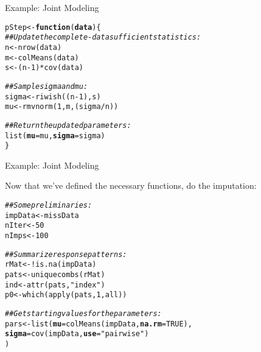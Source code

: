 \documentclass{beamer}\usepackage[]{graphicx}\usepackage[]{color}
\makeatletter
\newcommand{\hlnum}[1]{\textcolor[rgb]{0.69,0.494,0}{#1}}%
\newcommand{\hlstr}[1]{\textcolor[rgb]{0.749,0.012,0.012}{#1}}%
\newcommand{\hlcom}[1]{\textcolor[rgb]{0.514,0.506,0.514}{\textit{#1}}}%
\newcommand{\hlopt}[1]{\textcolor[rgb]{0,0,0}{#1}}%
\newcommand{\hlstd}[1]{\textcolor[rgb]{0,0,0}{#1}}%
\newcommand{\hlkwa}[1]{\textcolor[rgb]{0,0,0}{\textbf{#1}}}%
\newcommand{\hlkwb}[1]{\textcolor[rgb]{0,0.341,0.682}{#1}}%
\newcommand{\hlkwc}[1]{\textcolor[rgb]{0,0,0}{\textbf{#1}}}%
\newcommand{\hlkwd}[1]{\textcolor[rgb]{0.004,0.004,0.506}{#1}}%
\newenvironment{kframe}{%
 \def\at@end@of@kframe{}%
 \ifinner\ifhmode%
  \def\at@end@of@kframe{\end{minipage}}%
  \begin{minipage}{\columnwidth}%
 \fi\fi%
 \def\FrameCommand##1{\hskip\@totalleftmargin \hskip-\fboxsep
 \colorbox{shadecolor}{##1}\hskip-\fboxsep
     \hskip-\linewidth \hskip-\@totalleftmargin \hskip\columnwidth}%
 \MakeFramed {\advance\hsize-\width
   \@totalleftmargin\z@ \linewidth\hsize
   \@setminipage}}%
 {\par\unskip\endMakeFramed%
 \at@end@of@kframe}
\newenvironment{knitrout}{}{} %
\makeatother
\begin{document}
\begin{frame}[fragile]{Example: Joint Modeling}

\begin{knitrout}\footnotesize
{}\color{fgcolor}\begin{kframe}
\begin{alltt}
\hlstd{pStep} \hlkwb{<-} \hlkwa{function}\hlstd{(}\hlkwc{data}\hlstd{) \{}
    \hlcom{## Update the complete-data sufficient statistics:}
    \hlstd{n} \hlkwb{<-} \hlkwd{nrow}\hlstd{(data)}
    \hlstd{m} \hlkwb{<-} \hlkwd{colMeans}\hlstd{(data)}
    \hlstd{s} \hlkwb{<-} \hlstd{(n} \hlopt{-} \hlnum{1}\hlstd{)} \hlopt{*} \hlkwd{cov}\hlstd{(data)}

    \hlcom{## Sample sigma and mu:}
    \hlstd{sigma} \hlkwb{<-} \hlkwd{riwish}\hlstd{((n} \hlopt{-} \hlnum{1}\hlstd{), s)}
    \hlstd{mu}    \hlkwb{<-} \hlkwd{rmvnorm}\hlstd{(}\hlnum{1}\hlstd{, m, (sigma} \hlopt{/} \hlstd{n))}

    \hlcom{## Return the updated parameters:}
    \hlkwd{list}\hlstd{(}\hlkwc{mu} \hlstd{= mu,} \hlkwc{sigma} \hlstd{= sigma)}
\hlstd{\}}
\end{alltt}
\end{kframe}
\end{knitrout}

\end{frame}


\begin{frame}[fragile]{Example: Joint Modeling}

  Now that we've defined the necessary functions, do the imputation:
  
\begin{knitrout}\footnotesize
{}\color{fgcolor}\begin{kframe}
\begin{alltt}
\hlcom{## Some preliminaries:}
\hlstd{impData} \hlkwb{<-} \hlstd{missData}
\hlstd{nIter}   \hlkwb{<-} \hlnum{50}
\hlstd{nImps}   \hlkwb{<-} \hlnum{100}

\hlcom{## Summarize response patterns:}
\hlstd{rMat} \hlkwb{<-} \hlopt{!}\hlkwd{is.na}\hlstd{(impData)}
\hlstd{pats} \hlkwb{<-} \hlkwd{uniquecombs}\hlstd{(rMat)}
\hlstd{ind}  \hlkwb{<-} \hlkwd{attr}\hlstd{(pats,} \hlstr{"index"}\hlstd{)}
\hlstd{p0}   \hlkwb{<-} \hlkwd{which}\hlstd{(}\hlkwd{apply}\hlstd{(pats,} \hlnum{1}\hlstd{, all))}

\hlcom{## Get starting values for the parameters:}
\hlstd{pars} \hlkwb{<-} \hlkwd{list}\hlstd{(}\hlkwc{mu}    \hlstd{=} \hlkwd{colMeans}\hlstd{(impData,} \hlkwc{na.rm} \hlstd{=} \hlnum{TRUE}\hlstd{),}
             \hlkwc{sigma} \hlstd{=} \hlkwd{cov}\hlstd{(impData,} \hlkwc{use} \hlstd{=} \hlstr{"pairwise"}\hlstd{)}
             \hlstd{)}
\end{alltt}
\end{kframe}
\end{knitrout}

\end{frame}
\end{document}
